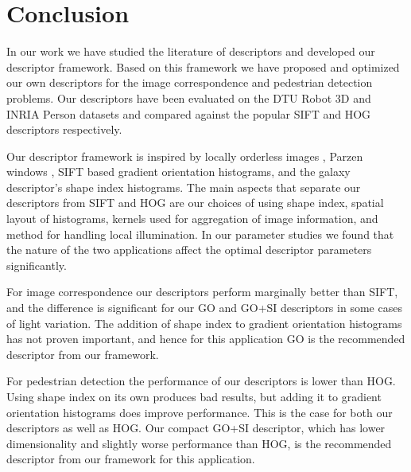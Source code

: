 \documentclass[thesis.tex]{subfiles}
\begin{document}
\chapter{Conclusion}

In our work we have studied the literature of descriptors and developed our descriptor framework. Based on this framework we have proposed and optimized our own descriptors for the image correspondence and pedestrian detection problems. Our descriptors have been evaluated on the DTU Robot 3D and INRIA Person datasets and compared against the popular SIFT \cite{lowe2004distinctive} and HOG \cite{felzenszwalb2009object} descriptors respectively.

Our descriptor framework is inspired by locally orderless images \cite{koenderink1999structure}, Parzen windows \cite{parzen1962estimation}, SIFT based gradient orientation histograms, and the galaxy descriptor's \cite{pedersen2013shape} shape index histograms. The main aspects that separate our descriptors from SIFT and HOG are our choices of using shape index, spatial layout of histograms, kernels used for aggregation of image information, and method for handling local illumination. In our parameter studies we found that the nature of the two applications affect the optimal descriptor parameters significantly.

For image correspondence our descriptors perform marginally better than SIFT, and the difference is significant for our GO and GO+SI descriptors in some cases of light variation. The addition of shape index to gradient orientation histograms has not proven important, and hence for this application GO is the recommended descriptor from our framework.

For pedestrian detection the performance of our descriptors is lower than HOG. Using shape index on its own produces bad results, but adding it to gradient orientation histograms does improve performance. This is the case for both our descriptors as well as HOG. Our compact GO+SI descriptor, which has lower dimensionality and slightly worse performance than HOG, is the recommended descriptor from our framework for this application.

\subbibliography
\end{document}
